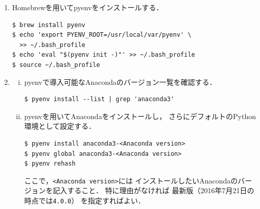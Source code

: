 \begin{enumerate}
\item
Homebrewを用いてpyenvをインストールする．

\begin{lstlisting}[style=cmdline]
$ brew install pyenv
$ echo 'export PYENV_ROOT=/usr/local/var/pyenv' \
  >> ~/.bash_profile
$ echo 'eval "$(pyenv init -)"' >> ~/.bash_profile
$ source ~/.bash_profile
\end{lstlisting}
\item\label{enum: Mac OS Xへの新規インストール - Anacondaのインストール}
\begin{enumerate}[(i)]
\item
pyenvで導入可能なAnacondaのバージョン一覧を確認する．
\begin{lstlisting}[style=cmdline]
$ pyenv install --list | grep 'anaconda3'
\end{lstlisting}
\item
pyenvを用いてAnacondaをインストールし，
さらにデフォルトのPython環境として設定する．
\begin{lstlisting}[style=cmdline]
$ pyenv install anaconda3-<Anaconda version>
$ pyenv global anaconda3-<Anaconda version>
$ pyenv rehash
\end{lstlisting}
ここで，\verb|<Anaconda version>|には
インストールしたいAnacondaのバージョンを記入すること．
特に理由がなければ
最新版（2016年7月21日の時点では\verb|4.0.0|）
を指定すればよい．
\end{enumerate}
\end{enumerate}


